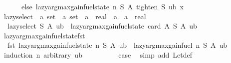 \begin{isabellebody}
\ \ \ \ \ \ else\ lazy{\isacharunderscore}{\kern0pt}argmax{\isacharunderscore}{\kern0pt}gain{\isacharunderscore}{\kern0pt}fuel{\isacharunderscore}{\kern0pt}state\ n\ S\ A\ {\isacharparenleft}{\kern0pt}tighten\ S\ ub\ x{\isacharparenright}{\kern0pt}{\isacharparenright}{\kern0pt}{\isachardoublequoteclose}\isanewline
\isanewline
{}\isamarkupfalse%
\ lazy{\isacharunderscore}{\kern0pt}select\ {\isacharcolon}{\kern0pt}{\isacharcolon}{\kern0pt}\ {\isachardoublequoteopen}{\isacharprime}{\kern0pt}a\ set\ {\isasymRightarrow}\ {\isacharprime}{\kern0pt}a\ set\ {\isasymRightarrow}\ {\isacharparenleft}{\kern0pt}{\isacharprime}{\kern0pt}a\ {\isasymRightarrow}\ real{\isacharparenright}{\kern0pt}\ {\isasymRightarrow}\ {\isacharparenleft}{\kern0pt}{\isacharprime}{\kern0pt}a\ {\isasymtimes}\ {\isacharparenleft}{\kern0pt}{\isacharprime}{\kern0pt}a\ {\isasymRightarrow}\ real{\isacharparenright}{\kern0pt}{\isacharparenright}{\kern0pt}{\isachardoublequoteclose}\ \isanewline
\ \ {\isachardoublequoteopen}lazy{\isacharunderscore}{\kern0pt}select\ S\ A\ ub\ {\isacharequal}{\kern0pt}\ lazy{\isacharunderscore}{\kern0pt}argmax{\isacharunderscore}{\kern0pt}gain{\isacharunderscore}{\kern0pt}fuel{\isacharunderscore}{\kern0pt}state\ {\isacharparenleft}{\kern0pt}card\ A{\isacharparenright}{\kern0pt}\ S\ A\ ub{\isachardoublequoteclose}\isanewline
\isanewline
{}\isamarkupfalse%
\ lazy{\isacharunderscore}{\kern0pt}argmax{\isacharunderscore}{\kern0pt}gain{\isacharunderscore}{\kern0pt}fuel{\isacharunderscore}{\kern0pt}state{\isacharunderscore}{\kern0pt}fst{\isacharcolon}{\kern0pt}\isanewline
\ \ {\isachardoublequoteopen}fst\ {\isacharparenleft}{\kern0pt}lazy{\isacharunderscore}{\kern0pt}argmax{\isacharunderscore}{\kern0pt}gain{\isacharunderscore}{\kern0pt}fuel{\isacharunderscore}{\kern0pt}state\ n\ S\ A\ ub{\isacharparenright}{\kern0pt}\ {\isacharequal}{\kern0pt}\ lazy{\isacharunderscore}{\kern0pt}argmax{\isacharunderscore}{\kern0pt}gain{\isacharunderscore}{\kern0pt}fuel\ n\ S\ A\ ub{\isachardoublequoteclose}\isanewline
%
\isadelimproof
%
\endisadelimproof
%
\isatagproof
{}\isamarkupfalse%
\ {\isacharparenleft}{\kern0pt}induction\ n\ arbitrary{\isacharcolon}{\kern0pt}\ ub{\isacharparenright}{\kern0pt}\isanewline
\ \ \isamarkupfalse%
\ {}\isanewline
\ \ \isamarkupfalse%
\ \isamarkupfalse%
\ {\isacharquery}{\kern0pt}case\ \isamarkupfalse%
\ {\isacharparenleft}{\kern0pt}simp\ add{\isacharcolon}{\kern0pt}\ Let{\isacharunderscore}{\kern0pt}def{\isacharparenright}{\kern0pt}\isanewline

\end{isabellebody}

